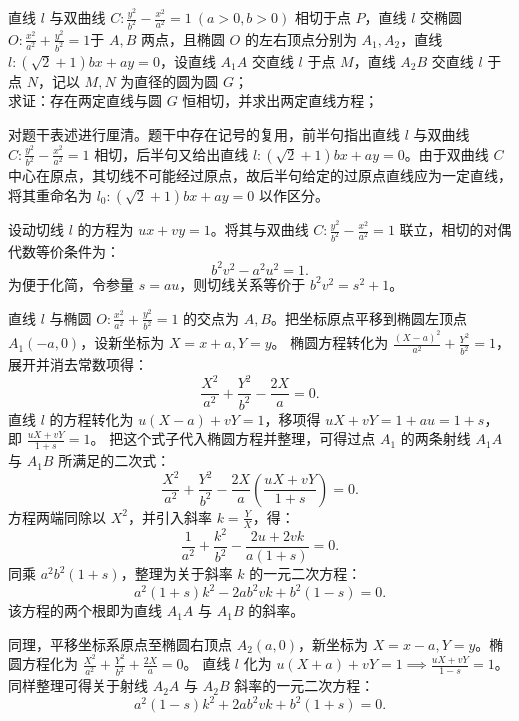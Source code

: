\begin{exercise}
直线 \(l\) 与双曲线 \(C: \frac{y^2}{b^2} - \frac{x^2}{a^2} = 1\ (a > 0, b > 0)\) 相切于点 \(P\)，直线 \(l\) 交椭圆$O: \frac{x^2}{a^2} + \frac{y^2}{b^2} = 1$于 \(A,B\) 两点，且椭圆 \(O\) 的左右顶点分别为 \(A_1,A_2\)，直线 \(l: (\sqrt{2}+1)bx + ay = 0\)，设直线 \(A_1A\) 交直线 \(l\) 于点 \(M\)，直线 \(A_2B\) 交直线 \(l\) 于点 \(N\)，记以 \(M,N\) 为直径的圆为圆 \(G\)；\\
求证：存在两定直线与圆 \(G\) 恒相切，并求出两定直线方程；
\end{exercise}
\begin{solution}
对题干表述进行厘清。题干中存在记号的复用，前半句指出直线 $l$ 与双曲线 $C: \frac{y^2}{b^2} - \frac{x^2}{a^2} = 1$ 相切，后半句又给出直线 $l: (\sqrt{2}+1)bx + ay = 0$。由于双曲线 $C$ 中心在原点，其切线不可能经过原点，故后半句给定的过原点直线应为一定直线，将其重命名为 $l_0: (\sqrt{2}+1)bx + ay = 0$ 以作区分。

设动切线 $l$ 的方程为 $ux + vy = 1$。将其与双曲线 $C: \frac{y^2}{b^2} - \frac{x^2}{a^2} = 1$ 联立，相切的对偶代数等价条件为：
\[ b^2 v^2 - a^2 u^2 = 1. \]
为便于化简，令参量 $s = au$，则切线关系等价于 $b^2 v^2 = s^2 + 1$。

直线 $l$ 与椭圆 $O: \frac{x^2}{a^2}+\frac{y^2}{b^2}=1$ 的交点为 $A,B$。把坐标原点平移到椭圆左顶点 $A_1(-a,0)$，设新坐标为 $X=x+a,Y=y$。
椭圆方程转化为 $\frac{(X-a)^2}{a^2} + \frac{Y^2}{b^2} = 1$，展开并消去常数项得：
\[ \frac{X^2}{a^2} + \frac{Y^2}{b^2} - \frac{2X}{a} = 0. \]
直线 $l$ 的方程转化为 $u(X-a) + vY = 1$，移项得 $uX + vY = 1+au = 1+s$，即 $\frac{uX+vY}{1+s} = 1$。
把这个式子代入椭圆方程并整理，可得过点 $A_1$ 的两条射线 $A_1A$ 与 $A_1B$ 所满足的二次式：
\[ \frac{X^2}{a^2} + \frac{Y^2}{b^2} - \frac{2X}{a}\left(\frac{uX+vY}{1+s}\right) = 0. \]
方程两端同除以 $X^2$，并引入斜率 $k = \frac{Y}{X}$，得：
\[ \frac{1}{a^2} + \frac{k^2}{b^2} - \frac{2u + 2vk}{a(1+s)} = 0. \]
同乘 $a^2 b^2(1+s)$，整理为关于斜率 $k$ 的一元二次方程：
\[ a^2(1+s)k^2 - 2ab^2 v k + b^2(1-s) = 0. \]
该方程的两个根即为直线 $A_1A$ 与 $A_1B$ 的斜率。

同理，平移坐标系原点至椭圆右顶点 $A_2(a, 0)$，新坐标为 $X = x-a, Y = y$。椭圆方程化为 $\frac{X^2}{a^2} + \frac{Y^2}{b^2} + \frac{2X}{a} = 0$。
直线 $l$ 化为 $u(X+a) + vY = 1 \implies \frac{uX+vY}{1-s} = 1$。
同样整理可得关于射线 $A_2A$ 与 $A_2B$ 斜率的一元二次方程：
\[ a^2(1-s)k^2 + 2ab^2 v k + b^2(1+s) = 0. \]


\end{solution}
